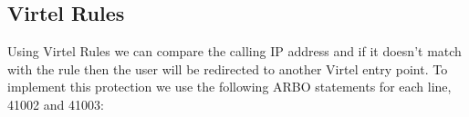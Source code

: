 \documentclass[letterpaper,10pt,english]{sphinxmanual}
\begin{document}
\ignorespaces 

\subsection{Virtel Rules}
\label{\detokenize{connectivity_guide:index-195}}\label{\detokenize{connectivity_guide:id79}}
\sphinxAtStartPar
Using Virtel Rules we can compare the calling IP address and if it doesn’t match with the rule then the user will be re\sphinxhyphen{}directed to another Virtel entry point. To implement this protection we use the following ARBO statements for each line, 41002 and 41003:\sphinxhyphen{}
\end{document}
